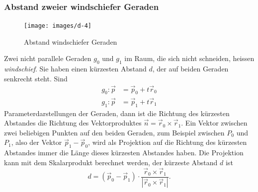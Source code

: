 \subsubsection{Abstand zweier windschiefer Geraden}
\begin{figure}
\begin{center}
\texttt{[image: images/d-4]}
\end{center}
\caption{Abstand windschiefer Geraden\label{windschief}}
\end{figure}
Zwei nicht parallele Geraden $g_0$ und $g_1$ im Raum,
die sich nicht schneiden, heissen
{\em windschief}.
Sie haben
einen kürzesten Abstand $d$, der auf beiden Geraden senkrecht steht.
Sind
\begin{align*}
g_0:
\vec p&=\vec p_0+t\vec r_0\\
g_1:
\vec p&=\vec p_1+t\vec r_1
\end{align*}
Parameterdarstellungen der Geraden, dann ist die Richtung des kürzesten
Abstandes die Richtung des Vektorproduktes $\vec n = \vec r_0\times\vec r_1$.
Ein Vektor zwischen zwei beliebigen Punkten auf den beiden Geraden,
zum Beispiel zwischen $P_0$ und $P_1$, also der Vektor $\vec p_1-\vec p_0$,
wird als Projektion auf die Richtung des kürzesten Abstandes immer die
Länge dieses kürzesten Abstandes haben.
Die Projektion kann mit dem
Skalarprodukt berechnet werden, der kürzeste Abstand $d$ ist
\[
d=(\vec p_0-\vec p_1)\cdot\frac{\vec r_0\times\vec r_1}{|\vec r_0\times\vec r_1|}.
\]

